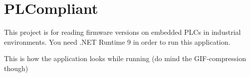 \chapter{PLCompliant }
\hypertarget{md__r_e_a_d_m_e}{}\label{md__r_e_a_d_m_e}
\label{md__r_e_a_d_m_e_autotoc_md0}%
%


This project is for reading firmware versions on embedded PLCs in industrial environments. You need .NET Runtime 9 in order to run this application.

This is how the application looks while running (do mind the GIF-\/compression though)  